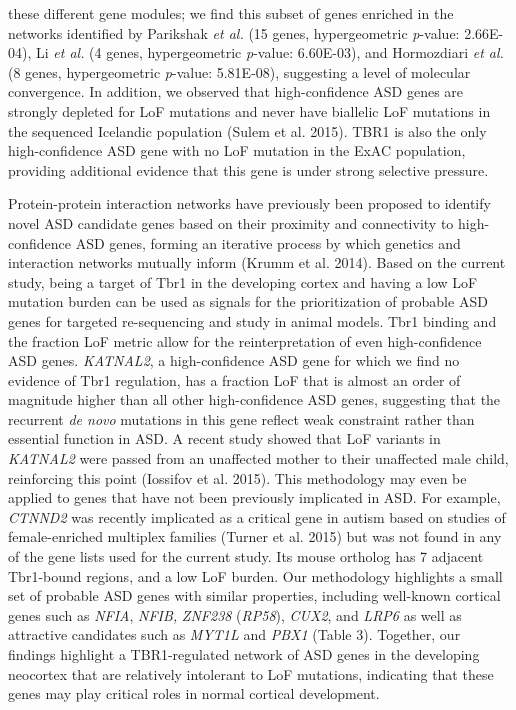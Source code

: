 \documentclass[]{article}
\begin{document}
these different gene modules; we find this subset of genes enriched in
the networks identified by Parikshak \emph{et al.} (15 genes,
hypergeometric \emph{p}-value: 2.66E-04), Li \emph{et al.} (4 genes,
hypergeometric \emph{p}-value: 6.60E-03), and Hormozdiari \emph{et al.}
(8 genes, hypergeometric \emph{p}-value: 5.81E-08), suggesting a level
of molecular convergence. In addition, we observed that high-confidence
ASD genes are strongly depleted for LoF mutations and never have
biallelic LoF mutations in the sequenced Icelandic population (Sulem et
al. 2015). TBR1 is also the only high-confidence ASD gene with no LoF
mutation in the ExAC population, providing additional evidence that this
gene is under strong selective pressure.

Protein-protein interaction networks have previously been proposed to
identify novel ASD candidate genes based on their proximity and
connectivity to high-confidence ASD genes, forming an iterative process
by which genetics and interaction networks mutually inform (Krumm et al.
2014). Based on the current study, being a target of Tbr1 in the
developing cortex and having a low LoF mutation burden can be used as
signals for the prioritization of probable ASD genes for targeted
re-sequencing and study in animal models. Tbr1 binding and the fraction
LoF metric allow for the reinterpretation of even high-confidence ASD
genes. \emph{KATNAL2}, a high-confidence ASD gene for which we find no
evidence of Tbr1 regulation, has a fraction LoF that is almost an order
of magnitude higher than all other high-confidence ASD genes, suggesting
that the recurrent \emph{de novo} mutations in this gene reflect weak
constraint rather than essential function in ASD. A recent study showed
that LoF variants in \emph{KATNAL2} were passed from an unaffected
mother to their unaffected male child, reinforcing this point (Iossifov
et al. 2015). This methodology may even be applied to genes that have
not been previously implicated in ASD. For example, \emph{CTNND2} was
recently implicated as a critical gene in autism based on studies of
female-enriched multiplex families (Turner et al. 2015) but was not
found in any of the gene lists used for the current study. Its mouse
ortholog has 7 adjacent Tbr1-bound regions, and a low LoF burden. Our
methodology highlights a small set of probable ASD genes with similar
properties, including well-known cortical genes such as \emph{NFIA},
\emph{NFIB,} \emph{ZNF238} (\emph{RP58}), \emph{CUX2}, and \emph{LRP6}
as well as attractive candidates such as \emph{MYT1L} and \emph{PBX1}
(Table 3). Together, our findings highlight a TBR1-regulated network of
ASD genes in the developing neocortex that are relatively intolerant to
LoF mutations, indicating that these genes may play critical roles in
normal cortical development.
\end{document}
